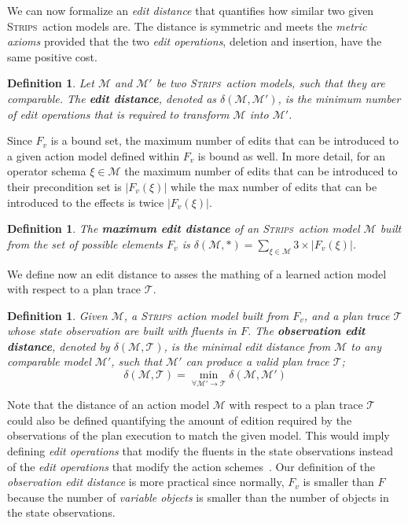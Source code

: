 \documentclass[letterpaper]{article} %
\newcommand{\strips}{\textsc{Strips}}     %
\newtheorem{definition}[theorem]{Definition}
\begin{document}
We can now formalize an {\em edit distance} that quantifies how similar two given \strips\ action models are. The distance is symmetric and meets the {\em metric axioms} provided that the two {\em edit operations}, deletion and insertion, have the same positive cost.

\begin{definition}
  Let $\mathcal{M}$ and $\mathcal{M}'$ be two \strips\ action models, such that they are {\em comparable}. The {\bf edit distance}, denoted as $\delta(\mathcal{M},\mathcal{M}')$, is the minimum number of {\em edit operations} that is required to transform $\mathcal{M}$ into $\mathcal{M}'$.
\end{definition}

Since $F_v$ is a bound set, the maximum number of edits that can be introduced to a given action model defined within $F_v$ is bound as well. In more detail, for an operator schema $\xi\in\mathcal{M}$ the maximum number of edits that can be introduced to their precondition set is $|F_v(\xi)|$ while the max number of edits that can be introduced to the effects is twice $|F_v(\xi)|$.
\begin{definition}
The \textbf{maximum edit distance} of an \strips\ action model $\mathcal{M}$ built from the set of possible elements $F_v$ is $\delta(\mathcal{M},*)=\sum_{\xi\in\mathcal{M}} 3\times|F_v(\xi)|$.
\end{definition}

We define now an edit distance to asses the mathing of a learned action model with respect to a plan trace $\mathcal{T}$. 

\begin{definition}
  Given $\mathcal{M}$, a \strips\ action model built from $F_v$, and a plan trace $\mathcal{T}$ whose state observation are built with fluents in $F$. The {\bf observation edit distance}, denoted by  $\delta(\mathcal{M},\mathcal{T})$, is the minimal edit distance from $\mathcal{M}$ to any {\em comparable} model $\mathcal{M}'$, such that $\mathcal{M}'$ can produce a valid plan trace $\mathcal{T}$; \[\delta(\mathcal{M},\mathcal{T})=\min_{\forall \mathcal{M}' \rightarrow \mathcal{T}} \delta(\mathcal{M},\mathcal{M}')\]
\end{definition}

Note that the distance of an action model $\mathcal{M}$ with respect to a plan trace $\mathcal{T}$ could also be defined quantifying the amount of edition required by the observations of the plan execution to match the given model. This would imply defining {\em edit operations} that modify the fluents in the state observations instead of the {\em edit operations} that modify the action schemes~\cite{sohrabi:precognition:IJCAI2016}. Our definition of the {\em observation edit distance} is more practical since normally, $F_v$ is smaller than $F$ because the number of {\em variable objects} is smaller than the number of objects in the state observations.
\end{document}
